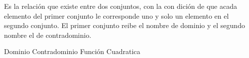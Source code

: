 
\question Es la relación que existe entre dos conjuntos, con la con dición
de que acada elemento del primer conjunto le corresponde uno y solo un
elemento en el segundo conjunto. El primer conjunto reibe el nombre de
dominio y el segundo nombre el de contradominio. 

  \begin{oneparchoices}
    \choice Dominio
    \choice Contradominio
    \CorrectChoice Función
    \choice Cuadratica
  \end{oneparchoices}
